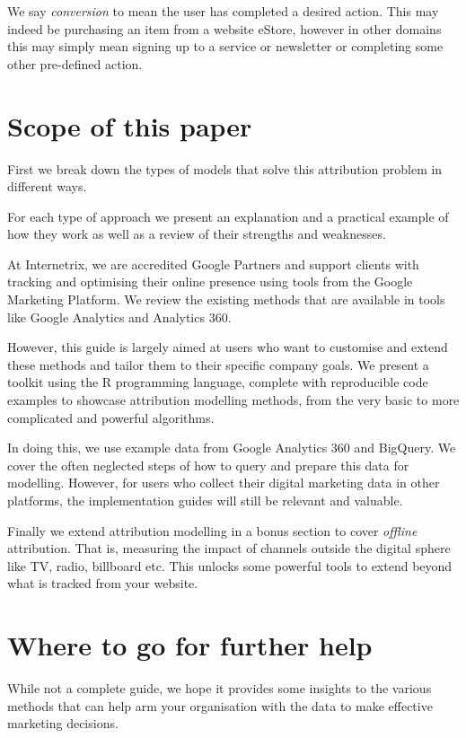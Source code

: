 \documentclass[]{book}
\begin{document}
We say \emph{conversion} to mean the user has completed a desired
action. This may indeed be purchasing an item from a website eStore,
however in other domains this may simply mean signing up to a service or
newsletter or completing some other pre-defined action.

\section{Scope of this paper}\label{scope-of-this-paper}

First we break down the types of models that solve this attribution
problem in different ways.

For each type of approach we present an explanation and a practical
example of how they work as well as a review of their strengths and
weaknesses.

At Internetrix, we are accredited Google Partners and support clients
with tracking and optimising their online presence using tools from the
Google Marketing Platform. We review the existing methods that are
available in tools like Google Analytics and Analytics 360.

However, this guide is largely aimed at users who want to customise and
extend these methods and tailor them to their specific company goals. We
present a toolkit using the R programming language, complete with
reproducible code examples to showcase attribution modelling methods,
from the very basic to more complicated and powerful algorithms.

In doing this, we use example data from Google Analytics 360 and
BigQuery. We cover the often neglected steps of how to query and prepare
this data for modelling. However, for users who collect their digital
marketing data in other platforms, the implementation guides will still
be relevant and valuable.

Finally we extend attribution modelling in a bonus section to cover
\emph{offline} attribution. That is, measuring the impact of channels
outside the digital sphere like TV, radio, billboard etc. This unlocks
some powerful tools to extend beyond what is tracked from your website.

\section{Where to go for further
help}\label{where-to-go-for-further-help}

While not a complete guide, we hope it provides some insights to the
various methods that can help arm your organisation with the data to
make effective marketing decisions.
\end{document}
